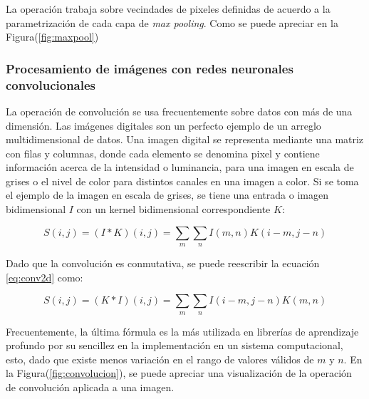         La operación trabaja sobre vecindades de pixeles definidas de acuerdo a la parametrización de cada 
        capa de \textit{max pooling}. Como se puede apreciar en la Figura(\ref{fig:maxpool})

        \subsubsection{Procesamiento de imágenes con redes neuronales convolucionales}
        La operación de convolución se usa frecuentemente sobre datos con más de una dimensión. Las imágenes digitales 
        son un perfecto ejemplo de un arreglo multidimensional de datos. Una imagen digital se representa mediante una
        matriz con filas y columnas, donde cada elemento se denomina pixel y contiene información acerca de la intensidad
        o luminancia, para una imagen en escala de grises o el nivel de color para distintos canales en una imagen a color.
        Si se toma el ejemplo de la imagen en escala de grises, se tiene una entrada o imagen bidimensional $I$ con un
        kernel bidimensional correspondiente $K$:

        \begin{equation} \label{eq:conv2d}
            S(i,j)=(I\ast K)(i,j) = \sum_{m} \sum_{n} I(m,n)K(i-m,j-n)
        \end{equation}

        Dado que la convolución es conmutativa, se puede reescribir la ecuación \ref{eq:conv2d} como:

        \begin{equation}
            S(i,j)=(K\ast I)(i,j) = \sum_{m} \sum_{n} I(i-m,j-n)K(m,n)
        \end{equation}

        Frecuentemente, la última fórmula es la más utilizada en librerías de aprendizaje profundo 
        por su sencillez en la implementación en un sistema computacional, esto, dado que existe menos 
        variación en el rango de valores válidos de $m$ y $n$. En la Figura(\ref{fig:convolucion}), se 
        puede apreciar una visualización de la operación de convolución aplicada a una imagen. 


